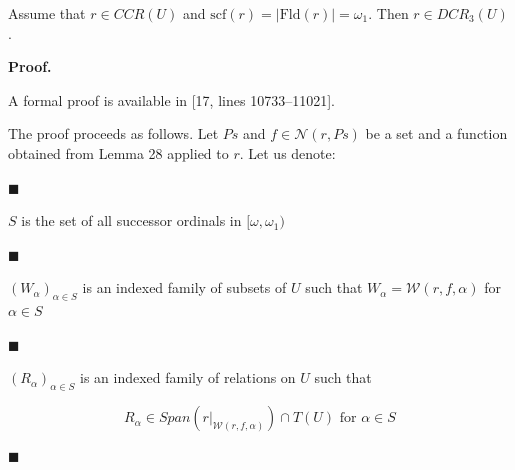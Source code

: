 \documentclass[10pt,a4paper]{amsart}
\begin{document}
 
 
Assume that $r\in CCR(U)$ and $\mathrm{scf}(r)=|\mathrm{Fld}(r)|=\omega_{1}$. Then $r\in DCR_{3}(U)$.\par
 
 
 
 
 
\par\medskip\noindent\textbf{Proof.}\par
 
 
A formal proof is available in [17, lines 10733–11021].\par
 
 
 
The proof proceeds as follows. Let $Ps$ and $f\in\mathcal{N}(r,Ps)$ be a set and a function obtained from Lemma 28 applied to $r$. Let us denote:\par
  
\par\noindent  $\blacksquare$ 
 
$S$ is the set of all successor ordinals in $[\omega,\omega_{1})$\par
 
 
 
\par\noindent  $\blacksquare$ 
 
$(W_{\alpha})_{\alpha\in S}$ is an indexed family of subsets of $U$ such that $W_{\alpha}=\mathcal{W}(r,f,\alpha)$ for $\alpha\in S$\par
 
 
 
\par\noindent  $\blacksquare$ 
 
$(R_{\alpha})_{\alpha\in S}$ is an indexed family of relations on $U$ such that\par
    \[R_{\alpha}\in{Span}(r|_{\mathcal{W}(r,f,\alpha)})\cap T(U)\text{ for }\alpha\in
S\]    
 
 
\par\noindent  $\blacksquare$ 
 
\end{document}
